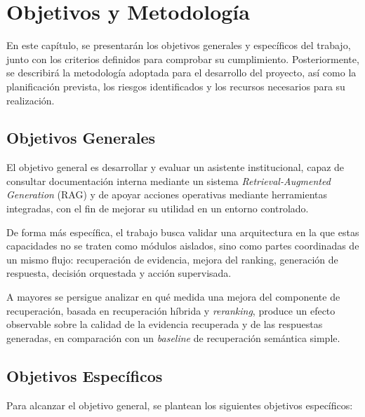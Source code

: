 \chapter{Objetivos y Metodología}\label{chap:objetivos}

En este capítulo, se presentarán los objetivos generales y específicos del trabajo, junto con los criterios definidos para comprobar su cumplimiento. 
Posteriormente, se describirá la metodología adoptada para el desarrollo del proyecto, así como la planificación prevista, los riesgos identificados y los recursos necesarios para su realización.

\section{Objetivos Generales}\label{sec:objgenerales}


El objetivo general es desarrollar y evaluar un asistente institucional, capaz de consultar documentación interna mediante un sistema \textit{Retrieval-Augmented Generation} (RAG) y de apoyar acciones operativas mediante herramientas integradas, con el fin de mejorar su utilidad en un entorno controlado.

De forma más específica, el trabajo busca validar una arquitectura en la que estas capacidades no se traten como módulos aislados, sino como partes coordinadas de un mismo flujo: recuperación de evidencia, mejora del ranking, generación de respuesta, decisión orquestada y acción supervisada.

A mayores se persigue analizar en qué medida una mejora del componente de recuperación, basada en recuperación híbrida y \textit{reranking}, produce un efecto observable sobre la calidad de la evidencia recuperada y de las respuestas generadas, en comparación con un \textit{baseline} de recuperación semántica simple.

\section{Objetivos Específicos}\label{sec:objespecificos}

Para alcanzar el objetivo general, se plantean los siguientes objetivos específicos:

